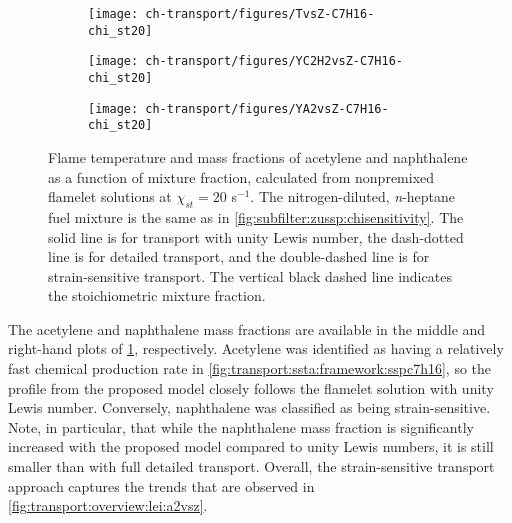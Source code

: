 
\begin{figure}[ht]
  \centering
  \begin{subfigure}[b]{0.33\linewidth}
    \texttt{[image: ch-transport/figures/TvsZ-C7H16-chi\_st20]}
  \end{subfigure}%
  \begin{subfigure}[b]{0.33\linewidth}
    \texttt{[image: ch-transport/figures/YC2H2vsZ-C7H16-chi\_st20]}
  \end{subfigure}%
  \begin{subfigure}[b]{0.33\linewidth}
    \texttt{[image: ch-transport/figures/YA2vsZ-C7H16-chi\_st20]}
  \end{subfigure}
  \caption[\texorpdfstring{$T$}{T}, \texorpdfstring{$Y_{\ce{C2H2}}$}{YC2H2}, and \texorpdfstring{$Y_{\text{A2}}$}{YA2} for Various Transport Approaches Within a / Mixture]{Flame temperature and mass fractions of acetylene and naphthalene as a function of mixture fraction, calculated from nonpremixed flamelet solutions at $\chi_{st} = 20$ s$^{-1}$. The nitrogen-diluted, \textit{n}-heptane fuel mixture is the same as in \cref{fig:subfilter:zussp:chisensitivity}. The solid line is for transport with unity Lewis number, the dash-dotted line is for detailed transport, and the double-dashed line is for strain-sensitive transport. The vertical black dashed line indicates the stoichiometric mixture fraction.}
  \label{fig:transport:ssta:dns:tc2h2a2vsz}
\end{figure}

The acetylene and naphthalene mass fractions are available in the middle and right-hand plots of \cref{fig:transport:ssta:dns:tc2h2a2vsz}, respectively. Acetylene was identified as having a relatively fast chemical production rate in \cref{fig:transport:ssta:framework:sspc7h16}, so the profile from the proposed model closely follows the flamelet solution with unity Lewis number. Conversely, naphthalene was classified as being strain-sensitive. Note, in particular, that while the naphthalene mass fraction is significantly increased with the proposed model compared to unity Lewis numbers, it is still smaller than with full detailed transport. Overall, the strain-sensitive transport approach captures the trends that are observed in \cref{fig:transport:overview:lei:a2vsz}. 


